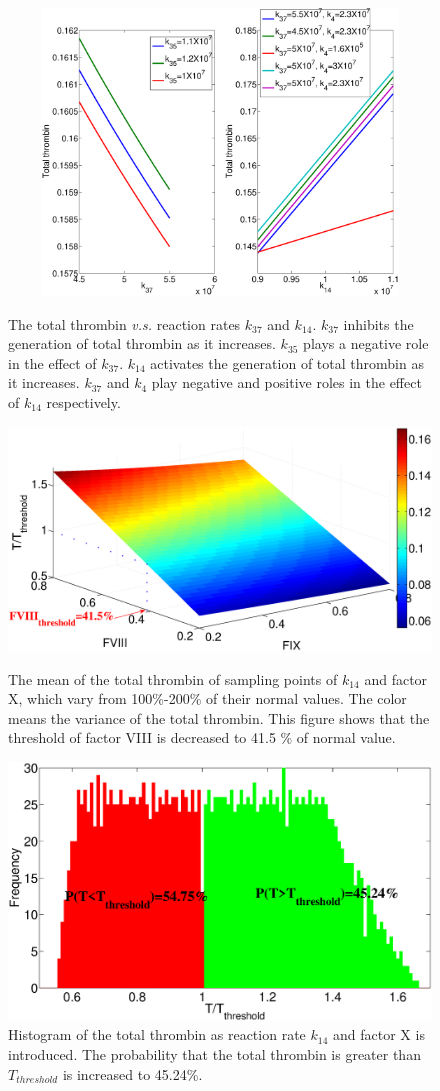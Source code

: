 \begin{figure}
\begin{center}
  \includegraphics[width=5in,height=3in]{figures/rv.eps}
\caption{The total thrombin \textit{v.s.} reaction rates $k_{37}$
and $k_{14}$. $k_{37}$ inhibits the generation of total thrombin as
it increases. $k_{35}$ plays a negative role in the effect of
$k_{37}$. $k_{14}$ activates the generation of total thrombin as it
increases. $k_{37}$ and $k_4$ play negative and positive roles in
the effect of $k_{14}$ respectively.}\label{Fig:RV}

  \includegraphics[width=5in]{figures/F89m.eps}
\caption{The mean of the total thrombin of sampling points of
$k_{14}$ and factor X, which vary from 100\%-200\% of their normal
values. The color means the variance of the total thrombin. This
figure shows that the threshold of factor VIII is decreased to 41.5
\% of normal value.}\label{Fig:F89m}

  \includegraphics[width=5in]{figures/F89mhist.eps}
\caption{Histogram of the total thrombin as reaction rate $k_{14}$
and factor X is introduced. The probability that the total thrombin
is greater than $T_{threshold}$ is increased to
45.24\%.}\label{Fig:F89mhist}


\end{center}
\end{figure}
